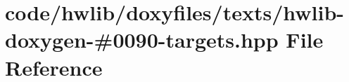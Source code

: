 \hypertarget{hwlib-doxygen-#0090-targets_8hpp}{}\section{code/hwlib/doxyfiles/texts/hwlib-\/doxygen-\/\#0090-\/targets.hpp File Reference}
\label{hwlib-doxygen-#0090-targets_8hpp}
